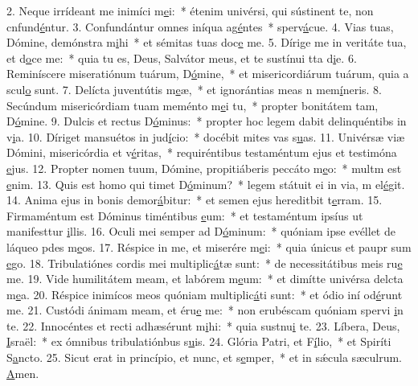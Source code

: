 2. Neque irrídeant me inimíci m\uline{e}i:~* étenim univérsi, qui sústinent te, non cnfund\uline{é}ntur.
3. Confundántur omnes iníqua ag\uline{é}ntes~* sperv\uline{á}cue.
4. Vias tuas, Dómine, demónstra m\uline{i}hi~* et sémitas tuas doc\uline{e} me.
5. Dírige me in veritáte tua, et d\uline{o}ce me:~* quia tu es, Deus, Salvátor meus, et te sustínui tta d\uline{i}e.
6. Reminíscere miseratiónum tuárum, D\uline{ó}mine,~* et misericordiárum tuárum, quia a scul\uline{o} sunt.
7. Delícta juventútis m\uline{e}æ,~* et ignorántias meas n mem\uline{í}neris.
8. Secúndum misericórdiam tuam meménto m\uline{e}i tu,~* propter bonitátem tam, D\uline{ó}mine.
9. Dulcis et rectus D\uline{ó}minus:~* propter hoc legem dabit delinquéntibs in v\uline{i}a.
10. Díriget mansuétos in jud\uline{í}cio:~* docébit mites vas s\uline{u}as.
11. Univérsæ viæ Dómini, misericórdia et v\uline{é}ritas,~* requiréntibus testaméntum ejus et testimóna \uline{e}jus.
12. Propter nomen tuum, Dómine, propitiáberis peccáto m\uline{e}o:~* multm est \uline{e}nim.
13. Quis est homo qui timet D\uline{ó}minum?~* legem státuit ei in via, m el\uline{é}git.
14. Anima ejus in bonis demor\uline{á}bitur:~* et semen ejus hereditbit t\uline{e}rram.
15. Firmaméntum est Dóminus timéntibus \uline{e}um:~* et testaméntum ipsíus ut manifesttur \uline{i}llis.
16. Oculi mei semper ad D\uline{ó}minum:~* quóniam ipse evéllet de láqueo pdes m\uline{e}os.
17. Réspice in me, et miserére m\uline{e}i:~* quia únicus et paupr sum \uline{e}go.
18. Tribulatiónes cordis mei multiplic\uline{á}tæ sunt:~* de necessitátibus meis ru\uline{e} me.
19. Vide humilitátem meam, et labórem m\uline{e}um:~* et dimítte univérsa delcta m\uline{e}a.
20. Réspice inimícos meos quóniam multiplic\uline{á}ti sunt:~* et ódio iní od\uline{é}runt me.
21. Custódi ánimam meam, et éru\uline{e} me:~* non erubéscam quóniam spervi \uline{i}n te.
22. Innocéntes et recti adhæsérunt m\uline{i}hi:~* quia sustnu\uline{i} te.
23. Líbera, Deus, \uline{I}sraël:~* ex ómnibus tribulatiónbus s\uline{u}is.
24. Glória Patri, et F\uline{í}lio,~* et Spiríti S\uline{a}ncto.
25. Sicut erat in princípio, et nunc, et s\uline{e}mper,~* et in sǽcula sæculrum. \uline{A}men.
